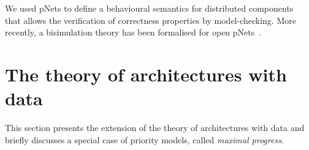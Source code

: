 \documentclass{llncs}
\begin{document}
We  used pNets to define a behavioural semantics for distributed components~\cite{AmeurBoulifa2017} that allows the verification of correctness properties  by model-checking. 
More recently, a bisimulation theory has been formalised for open pNets~\cite{HMZ-FORTE2016}.



\section{The theory of architectures with data}
\label{secn:archs}

This section presents the extension of the theory of
  architectures \cite{AttieBBJS16-architectures-faoc} with data and
  briefly discusses a special case of priority models, called
  \emph{maximal progress}.

\end{document}
